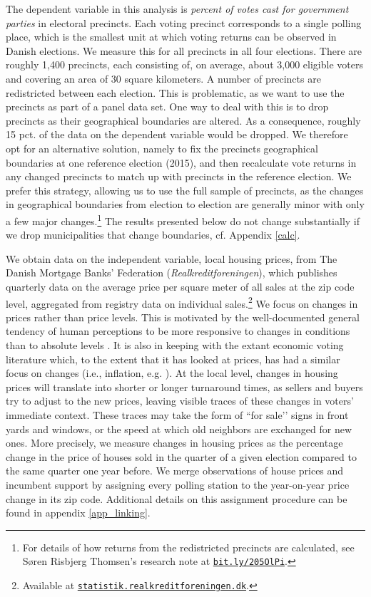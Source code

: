 \documentclass[12pt,a4paper]{article}
\begin{document}
	The dependent variable in this analysis is \textit{percent of votes cast for government parties} in electoral precincts. Each voting precinct corresponds to a single polling place, which is the smallest unit at which voting returns can be observed in Danish elections. We measure this for all precincts in all four elections. There are roughly 1,400 precincts, each consisting of, on average, about 3,000 eligible voters and covering an area of 30 square kilometers. A number of precincts are redistricted between each election. This is problematic, as we want to use the precincts as part of a panel data set. One way to deal with this is to drop precincts as their geographical boundaries are altered. As a consequence, roughly 15 pct. of the data on the dependent variable would be dropped. We therefore opt for an alternative solution, namely to fix the precincts geographical boundaries at one reference election (2015), and then recalculate vote returns in any changed precincts to match up with precincts in the reference election. We prefer this strategy, allowing us to use the full sample of precincts, as the changes in geographical boundaries from election to election are generally minor with only a few major changes.\footnote{For details of how returns from the redistricted precincts are calculated, see Søren Risbjerg Thomsen's research note at \texttt{\href{http://bit.ly/205OlPi}{bit.ly/205OlPi}}.} The results presented below do not change substantially if we drop municipalities that change boundaries, cf. Appendix \ref{calc}.
	
	We obtain data on the independent variable, local housing prices, from The Danish Mortgage Banks' Federation (\textit{Realkreditforeningen}), which publishes quarterly data on the average price per square meter of all sales at the zip code level, aggregated from registry data on individual sales.\footnote{Available at \texttt{\href{http://statistik.realkreditforeningen.dk/}{statistik.realkreditforeningen.dk}}.} We focus on changes in prices rather than price levels. This is motivated by the well-documented general tendency of human perceptions to be more responsive to changes in conditions than to absolute levels \citep{kahneman1979prospect}. It is also in keeping with the extant economic voting literature which, to the extent that it has looked at prices, has had a similar focus on changes (i.e., inflation, e.g. \citealp{kramer1971short}). At the local level, changes in housing prices will translate into shorter or longer turnaround times, as sellers and buyers try to adjust to the new prices, leaving visible traces of these changes in voters’ immediate context. These traces may take the form of ``for sale’’ signs in front yards and windows, or the speed at which old neighbors are exchanged for new ones. More precisely, we measure changes in housing prices as the percentage change in the price of houses sold in the quarter of a given election compared to the same quarter one year before. We merge observations of house prices and incumbent support by assigning every polling station to the year-on-year price change in its zip code. Additional details on this assignment procedure can be found in appendix \ref{app_linking}.
	
\end{document}
